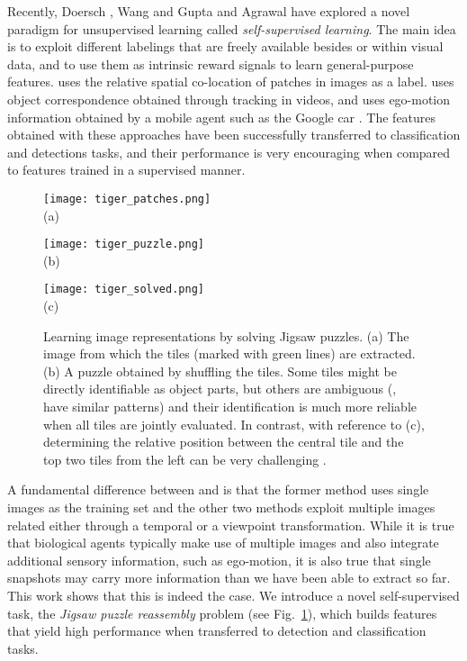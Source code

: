 \documentclass[runningheads]{llncs}
\begin{document}
Recently, Doersch \etal \cite{Carl2015}, Wang and Gupta \cite{Gupta15} and Agrawal \etal \cite{agrawalCM15} have explored a novel paradigm for unsupervised learning called \emph{self-supervised learning}. The main idea is to exploit different labelings that are freely available besides or within visual data, and to use them as intrinsic reward signals to learn general-purpose features. \cite{Carl2015} uses the relative spatial co-location of patches in images as a label. \cite{Gupta15} uses object correspondence obtained through tracking in videos, and \cite{agrawalCM15} uses ego-motion information obtained by a mobile agent such as the Google car \cite{ChenBKTVPRCBPGG11}. The features obtained with these approaches have been successfully transferred to classification and detections tasks, and their performance is very encouraging when compared to features trained in a supervised manner.
\begin{figure}[t]
\centering
\begin{minipage}[c]{.375\textwidth}
\centering
\texttt{[image: tiger\_patches.png]}\\
\footnotesize{(a)}
\end{minipage}\hspace{2mm}
\begin{minipage}[c]{.28\textwidth}
\centering
\texttt{[image: tiger\_puzzle.png]}\\
\footnotesize{(b)}
\end{minipage}\hspace{2mm}
\begin{minipage}[c]{.28\textwidth}
\centering
\texttt{[image: tiger\_solved.png]}\\
\footnotesize{(c)}
\end{minipage}
 \caption{Learning image representations by solving Jigsaw puzzles. (a) The image from which the tiles (marked with green lines) are extracted. (b) A puzzle obtained by shuffling the tiles. Some tiles might be directly identifiable as object parts, but others are ambiguous (\eg, have similar patterns) and their identification is much more reliable when all tiles are jointly evaluated. 
In contrast, with reference to (c), determining the relative position between the central tile and the top two tiles from the left can be very challenging \cite{Carl2015}.
 \label{fig:puzzle}}
\end{figure}

A fundamental difference between \cite{Carl2015} and \cite{Gupta15,agrawalCM15} is that the former method uses single images as the training set and the other two methods exploit multiple images related either through a temporal or a viewpoint transformation. While it is true that biological agents typically make use of multiple images and also integrate additional sensory information, such as ego-motion, it is also true that single snapshots may carry more information than we have been able to extract so far. This work shows that this is indeed the case. We introduce a novel self-supervised task, the \emph{Jigsaw puzzle reassembly} problem (see Fig.~\ref{fig:puzzle}), which builds features that yield high performance when transferred to detection and classification tasks.
\end{document}

